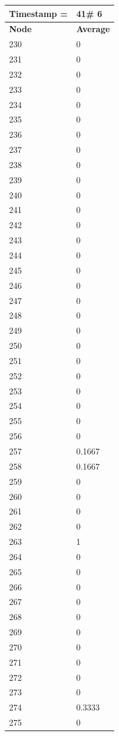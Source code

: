 \begin{tabular}{|l||l|}
\hline
\textbf{Timestamp =} & \textbf{41}\# 6\\\hline
	\textbf{Node} & \textbf{Average} \\ \hline
\hline
	230 & 0 \\ \hline
	231 & 0 \\ \hline
	232 & 0 \\ \hline
	233 & 0 \\ \hline
	234 & 0 \\ \hline
	235 & 0 \\ \hline
	236 & 0 \\ \hline
	237 & 0 \\ \hline
	238 & 0 \\ \hline
	239 & 0 \\ \hline
	240 & 0 \\ \hline
	241 & 0 \\ \hline
	242 & 0 \\ \hline
	243 & 0 \\ \hline
	244 & 0 \\ \hline
	245 & 0 \\ \hline
	246 & 0 \\ \hline
	247 & 0 \\ \hline
	248 & 0 \\ \hline
	249 & 0 \\ \hline
	250 & 0 \\ \hline
	251 & 0 \\ \hline
	252 & 0 \\ \hline
	253 & 0 \\ \hline
	254 & 0 \\ \hline
	255 & 0 \\ \hline
	256 & 0 \\ \hline
	257 & 0.1667 \\ \hline
	258 & 0.1667 \\ \hline
	259 & 0 \\ \hline
	260 & 0 \\ \hline
	261 & 0 \\ \hline
	262 & 0 \\ \hline
	263 & 1 \\ \hline
	264 & 0 \\ \hline
	265 & 0 \\ \hline
	266 & 0 \\ \hline
	267 & 0 \\ \hline
	268 & 0 \\ \hline
	269 & 0 \\ \hline
	270 & 0 \\ \hline
	271 & 0 \\ \hline
	272 & 0 \\ \hline
	273 & 0 \\ \hline
	274 & 0.3333 \\ \hline
	275 & 0 \\ \hline
\end{tabular}

